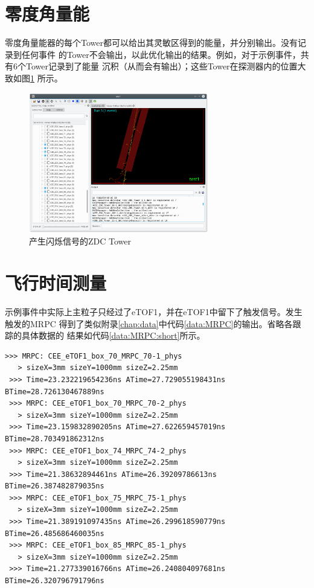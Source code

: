 \documentclass[bachelor,openany,oneside,color]{buaathesis}
\begin{document}
\section{零度角量能}

零度角量能器的每个Tower都可以给出其灵敏区得到的能量，并分别输出。没有记录到任何事件
的Tower不会输出，以此优化输出的结果。例如，对于示例事件，共有6个Tower记录到了能量
沉积（从而会有输出）；这些Tower在探测器内的位置大致如图\ref{fig:result:ZDC:Display}
所示。

\begin{figure}
	\centering
	\includegraphics[width=0.7\textwidth]{./resource/ZDC-Display.png}
	\caption{产生闪烁信号的ZDC Tower}\label{fig:result:ZDC:Display}
\end{figure}

\section{飞行时间测量}

示例事件中实际上主粒子只经过了eTOF1，并在eTOF1中留下了触发信号。发生触发的MRPC
得到了类似附录\ref{chap:data}中代码\ref{data:MRPC}的输出。省略各跟踪的具体数据的
结果如代码\ref{data:MRPC:short}所示。
\begin{lstlisting}[caption={eTOF1-MRPC简略版，其中所有size均为半长度},
	numbers=none,label={data:MRPC:short}]
 >>> MRPC: CEE_eTOF1_box_70_MRPC_70-1_phys
   > sizeX=3mm sizeY=1000mm sizeZ=2.25mm 
 >>> Time=23.232219654236ns ATime=27.729055198431ns BTime=28.726130467889ns
 >>> MRPC: CEE_eTOF1_box_70_MRPC_70-2_phys
   > sizeX=3mm sizeY=1000mm sizeZ=2.25mm 
 >>> Time=23.159832890205ns ATime=27.622659457019ns BTime=28.703491862312ns
 >>> MRPC: CEE_eTOF1_box_74_MRPC_74-2_phys
   > sizeX=3mm sizeY=1000mm sizeZ=2.25mm 
 >>> Time=21.38632894461ns ATime=26.39209786613ns BTime=26.387482879035ns
 >>> MRPC: CEE_eTOF1_box_75_MRPC_75-1_phys
   > sizeX=3mm sizeY=1000mm sizeZ=2.25mm 
 >>> Time=21.389191097435ns ATime=26.299618590779ns BTime=26.485686460035ns
 >>> MRPC: CEE_eTOF1_box_85_MRPC_85-1_phys
   > sizeX=3mm sizeY=1000mm sizeZ=2.25mm 
 >>> Time=21.277339016766ns ATime=26.240804097681ns BTime=26.320796791796ns
\end{lstlisting}
\end{document}
